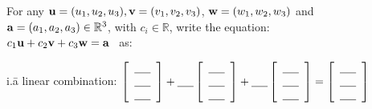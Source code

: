 \begin{myexa}[\bd{a}]
	For any $\mathbf{u}=({u_1},{u_2},{u_3}), \mathbf{v}=({v_1},{v_2},{v_3})$, $\mathbf{w}=({w_1},{w_2},{w_3})$ and $\mathbf{a}=({a_1},{a_2},{a_3}) \in \mathbb{R}^3$, with $c_i \in \mathbb{R}$, write the equation:\\ $c_1\mathbf{u}+c_2\mathbf{v}+c_3\mathbf{w} = \mathbf{a}$ \  as:
	\begin{tabbing}
			\indent i.\quad \= a linear combination:  \underline{\hspace{.2in} } $\left[ \begin{array}{c}  \underline{\hspace{.2in} }  \\	  \underline{\hspace{.2in} } \\  \underline{\hspace{.2in} }\\
			\end{array} \right] + \underline{\hspace{.2in} } \left[ \begin{array}{c} \underline{\hspace{.2in} } \\ \underline{\hspace{.2in} }  \\ \underline{\hspace{.2in} }	\\ \end{array} \right]+ \underline{\hspace{.2in} } \left[ \begin{array}{c} \underline{\hspace{.2in} } \\ \underline{\hspace{.2in} }  \\ \underline{\hspace{.2in} }	\\ \end{array} \right]   =  \left[ \begin{array}{c} \underline{\hspace{.2in} } \\  \underline{\hspace{.2in} } \\ \underline{\hspace{.2in} }	\\    \end{array} \right]$\\
			\\

\end{tabbing}
\end{myexa}
